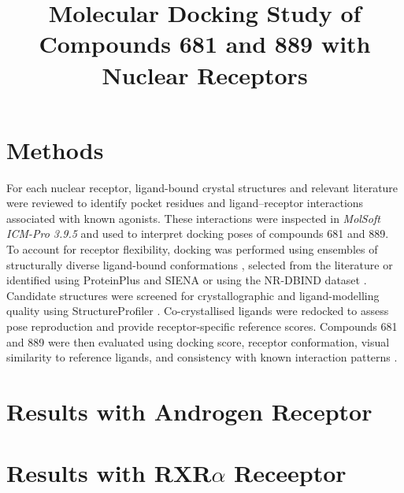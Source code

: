 \documentclass{article}
\title{Molecular Docking Study of Compounds 681 and 889 with Nuclear Receptors}
\date{}
\begin{document}
\maketitle
\thispagestyle{fancy}
\section{Methods}

For each nuclear receptor, ligand-bound crystal structures and relevant literature were reviewed to identify pocket residues and ligand--receptor interactions associated with known agonists. These interactions were inspected in \textit{MolSoft ICM-Pro 3.9.5} \cite{abagyan1994icm} and used to interpret docking poses of compounds 681 and 889. To account for receptor flexibility, docking was performed using ensembles of structurally diverse ligand-bound conformations \cite{bottegoni2009four,guedes2014receptor,park2010improved,rueda2010recipes,totrov2008flexible}, selected from the literature or identified using ProteinPlus and SIENA \cite{bietz2016siena,schoning2020proteins} or using the NR-DBIND dataset \cite{reau2018nuclear}. Candidate structures were screened for crystallographic and ligand-modelling quality using StructureProfiler \cite{friedrich2017high,hartshorn2007diverse,meyder2019structureprofiler,warren2012essential}. Co-crystallised ligands were redocked to assess pose reproduction and provide receptor-specific reference scores. Compounds 681 and 889 were then evaluated using docking score, receptor conformation, visual similarity to reference ligands, and consistency with known interaction patterns \cite{errington2025assessing,fischer2021decision}.






\section{Results with Androgen Receptor}


\section{Results with RXR\texorpdfstring{$\alpha$}{alpha} Receeptor}



\end{document}
